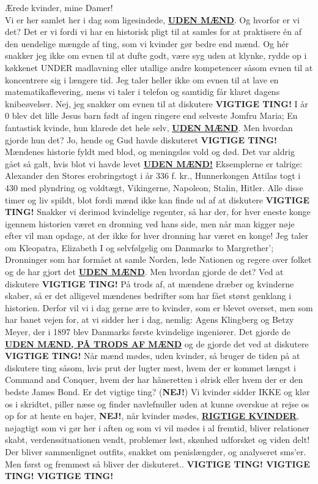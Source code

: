 Ærede kvinder, mine Damer! \\
Vi er her samlet her i dag som ligesindede, \underline{\textbf{UDEN MÆND}}. Og hvorfor er vi det? Det er vi fordi vi har en historisk pligt til at samles for at praktisere én af den uendelige mængde af ting, som vi kvinder gør bedre end mænd. Og hér snakker jeg ikke om evnen til at dufte godt, være syg uden at klynke, rydde op i køkkenet UNDER madlavning eller utallige andre kompetencer såsom evnen til at koncentrere sig i længere tid. Jeg taler heller ikke om evnen til at lave en matematikaflevering, mens vi taler i telefon og samtidig får klaret dagens knibeøvelser. Nej, jeg snakker om evnen til at diskutere \textbf{VIGTIGE TING!} I år 0 blev det lille Jesus barn født af ingen ringere end selveste Jomfru Maria; En fantastisk kvinde, hun klarede det hele selv, \underline{\textbf{UDEN MÆND}}. Men hvordan gjorde hun det? Jo, hende og Gud havde diskuteret \textbf{VIGTIGE TING!} Mændenes historie fyldt med blod, og meningsløs vold og død. Det var aldrig gået så galt, hvis blot vi havde levet \underline{\textbf{UDEN MÆND!}} Eksemplerne er talrige: Alexander den Stores erobringstogt i år 336 f. kr., Hunnerkongen Attilas togt i 430 med plyndring og voldtægt, Vikingerne, Napoleon, Stalin, Hitler. Alle disse timer og liv spildt, blot fordi mænd ikke kan finde ud af at diskutere \textbf{VIGTIGE TING!} Snakker vi derimod kvindelige regenter, så har der, for hver eneste konge igennem historien været en dronning ved hans side, men når man kigger nøje efter vil man opdage, at der ikke for hver dronning har været en konge! Jeg taler om Kleopatra, Elizabeth I og selvfølgelig om Danmarks to Margrether’; Dronninger som har formået at samle Norden, lede Nationen og regere over folket og de har gjort det \underline{\textbf{UDEN MÆND}}. Men hvordan gjorde de det? Ved at diskutere \textbf{VIGTIGE TING!} På trods af, at mændene dræber og kvinderne skaber, så er det alligevel mændenes bedrifter som har fået størst genklang i historien. Derfor vil vi i dag gerne ære to kvinder, som er blevet overset, men som har banet vejen for, at vi sidder her i dag, nemlig: Agens Klingberg og Betzy Meyer, der i 1897 blev Danmarks første kvindelige ingeniører. Det gjorde de \underline{\textbf{UDEN MÆND, PÅ TRODS AF MÆND}} og de gjorde det ved at diskutere \textbf{VIGTIGE TING!} Når mænd mødes, uden kvinder, så bruger de tiden på at diskutere ting såsom, hvis prut der lugter mest, hvem der er kommet længst i Command and Conquer, hvem der har håneretten i ølrisk eller hvem der er den bedste James Bond. Er det vigtige ting? (\textbf{NEJ!}) Vi kvinder sidder IKKE og klør os i skridtet, piller næse og finder navlefnuller uden at kunne overskue at rejse os op for at hente en bajer, \textbf{NEJ!}, når kvinder mødes, \underline{\textbf{RIGTIGE KVINDER}}, nøjagtigt som vi gør her i aften og som vi vil mødes i al fremtid, bliver relationer skabt, verdenssituationen vendt, problemer løst, skønhed udforsket og viden delt! Der bliver sammenlignet outfits, snakket om penislængder, og analyseret sms’er. Men først og fremmest så bliver der diskuteret.. \textbf{VIGTIGE TING! VIGTIGE TING! VIGTIGE TING!}
